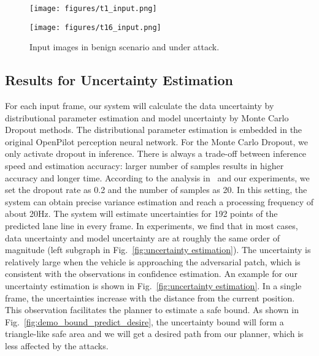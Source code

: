 \begin{figure}[htbp]
\centering
\begin{minipage}[t]{0.4\columnwidth}

\texttt{[image: figures/t1\_input.png]}

\end{minipage}
\begin{minipage}[t]{0.4\columnwidth}
\centering
\texttt{[image: figures/t16\_input.png]}

\end{minipage}
\caption{Input images in benign scenario and under attack. %
}
\label{fig:input}
\end{figure}

\subsection{Results for Uncertainty Estimation}
For each input frame, our system will calculate the data uncertainty by distributional parameter estimation and model uncertainty by Monte Carlo Dropout methods. The distributional parameter estimation is embedded in the original OpenPilot perception neural network. For the Monte Carlo Dropout, we only activate dropout in inference. There is always a trade-off between inference speed and estimation accuracy: larger number of samples results in higher accuracy and longer time. According to the analysis in~\cite{loquercio2020general} and our experiments, we set the dropout rate as 0.2 and the number of samples as 20. In this setting, the system can obtain precise variance estimation and reach a processing frequency of about 20Hz. The system will estimate uncertainties for 192 points of the predicted lane line in every frame. In experiments, we find that in most cases, data uncertainty and model uncertainty are at roughly the same order of magnitude (left subgraph in Fig.~\ref{fig:uncertainty estimation}). The uncertainty is relatively large when the vehicle is approaching the adversarial patch, which is consistent with the observations in confidence estimation. An example for our uncertainty estimation is shown in Fig.~\ref{fig:uncertainty estimation}. In a single frame, the uncertainties increase with the distance from the current position. This observation facilitates the planner to estimate a safe bound. As shown in Fig.~\ref{fig:demo_bound_predict_desire}, the uncertainty bound will form a triangle-like safe area and we will get a desired path from our planner, which is less affected by the attacks.  



